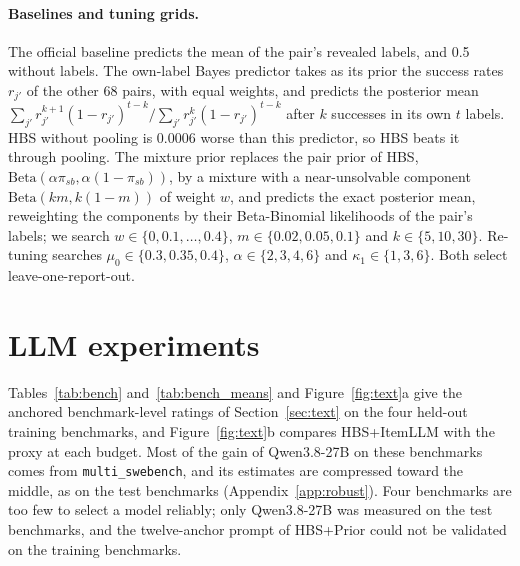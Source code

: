\documentclass{article}
\newcommand{\bench}[1]{\texttt{#1}}
\begin{document}
\paragraph{Baselines and tuning grids.} The official baseline predicts the mean of the pair's revealed labels, and 0.5 without labels. The own-label Bayes predictor takes as its prior the success rates $r_{j'}$ of the other 68 pairs, with equal weights, and predicts the posterior mean $\sum_{j'} r_{j'}^{k+1}(1 - r_{j'})^{t-k} / \sum_{j'} r_{j'}^{k}(1 - r_{j'})^{t-k}$ after $k$ successes in its own $t$ labels. HBS without pooling is 0.0006 worse than this predictor, so HBS beats it through pooling. The mixture prior replaces the pair prior of HBS, $\mathrm{Beta}(\alpha\pi_{sb}, \alpha(1 - \pi_{sb}))$, by a mixture with a near-unsolvable component $\mathrm{Beta}(km, k(1 - m))$ of weight $w$, and predicts the exact posterior mean, reweighting the components by their Beta-Binomial likelihoods of the pair's labels; we search $w \in \{0, 0.1, \dots, 0.4\}$, $m \in \{0.02, 0.05, 0.1\}$ and $k \in \{5, 10, 30\}$. Re-tuning searches $\mu_0 \in \{0.3, 0.35, 0.4\}$, $\alpha \in \{2, 3, 4, 6\}$ and $\kappa_1 \in \{1, 3, 6\}$. Both select leave-one-report-out.

\FloatBarrier
\section{LLM experiments}
\label{app:llm}

Tables~\ref{tab:bench} and~\ref{tab:bench_means} and Figure~\ref{fig:text}a give the anchored benchmark-level ratings of Section~\ref{sec:text} on the four held-out training benchmarks, and Figure~\ref{fig:text}b compares HBS+ItemLLM with the proxy at each budget. Most of the gain of Qwen3.8-27B on these benchmarks comes from \bench{multi\_swebench}, and its estimates are compressed toward the middle, as on the test benchmarks (Appendix~\ref{app:robust}). Four benchmarks are too few to select a model reliably; only Qwen3.8-27B was measured on the test benchmarks, and the twelve-anchor prompt of HBS+Prior could not be validated on the training benchmarks.
\end{document}

